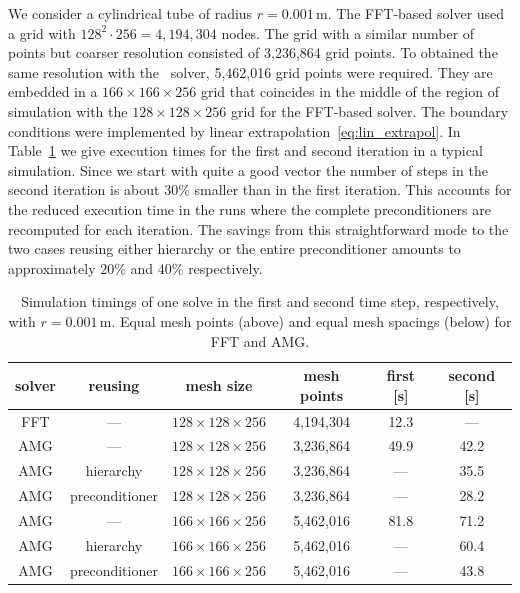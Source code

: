 We consider a cylindrical tube of radius $r=0.001$\,m.  The FFT-based
solver used a grid with $128^2\cdot256=4,194,304$ nodes.  The grid with
a similar number of points but coarser resolution consisted of 3,236,864
grid points.  To obtained the same resolution with the \oursolver\
solver, 5,462,016 grid points were required.  They are embedded in a
$166\times166\times256$ grid that coincides in the middle of the region
of simulation with the $128\times128\times256$ grid for the FFT-based
solver.  The boundary conditions were implemented by linear
extrapolation~\eqref{eq:lin_extrapol}.  In
Table~\ref{tbl:timings_variations_overview} we give execution times for
the first and second iteration in a typical simulation.  Since we start
with quite a good vector the number of steps in the second iteration is
about 30\% smaller than in the first iteration.  This accounts for the
reduced execution time in the runs where the complete preconditioners
are recomputed for each iteration.  The savings from this
straightforward mode to the two cases reusing either hierarchy or the
entire preconditioner amounts to approximately $20\%$ and $40\%$
respectively.

\begin{table}[ht]
  \begin{center}
    \begin{tabular}{cccccc}
    \hline
        solver & reusing & mesh size & mesh points & first [s] & second [s] \\
        \hline
        FFT & --- & $128\times128\times256$ & 4,194,304 & 12.3 & --- \\
        \hline
        AMG & --- & $128\times128\times256$ & 3,236,864 & 49.9 & 42.2 \\
        AMG & hierarchy & $128\times128\times256$ & 3,236,864 & --- & 35.5 \\
        AMG & preconditioner & $128\times128\times256$ & 3,236,864 & --- & 28.2 \\
        \hline
        AMG & --- & $166\times166\times256$ & 5,462,016 & 81.8 & 71.2 \\
        AMG & hierarchy & $166\times166\times256$ & 5,462,016 & --- & 60.4 \\
        AMG & preconditioner & $166\times166\times256$ & 5,462,016 & --- & 43.8 \\
        \hline
  \end{tabular}
  \caption{Simulation timings of one solve in the first and second time
    step, respectively, with $r=0.001$\,m.  Equal mesh points (above)
    and equal mesh spacings (below) for FFT and AMG.}
  \label{tbl:timings_variations_overview} \end{center}
\end{table}

